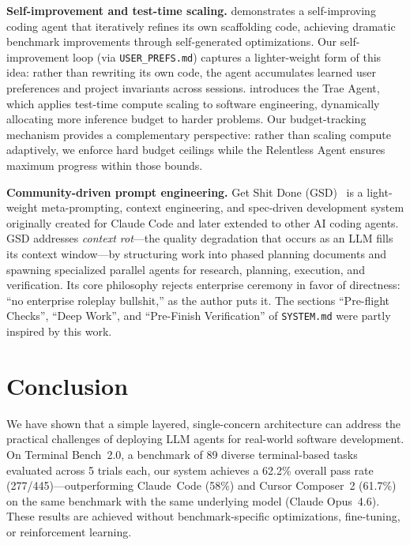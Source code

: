 \documentclass{article}
\begin{document}
\textbf{Self-improvement and test-time scaling.} \citet{robeyns2025selfimproving} demonstrates a self-improving coding agent that iteratively refines its own scaffolding code, achieving dramatic benchmark improvements through self-generated optimizations. Our self-improvement loop (via \texttt{USER\_PREFS.md}) captures a lighter-weight form of this idea: rather than rewriting its own code, the agent accumulates learned user preferences and project invariants across sessions.  \citet{gao2025trae} introduces the Trae Agent, which applies test-time compute scaling to software engineering, dynamically allocating more inference budget to harder problems.  Our budget-tracking mechanism provides a complementary perspective: rather than scaling compute adaptively, we enforce hard budget ceilings while the Relentless Agent ensures maximum progress within those bounds.

\textbf{Community-driven prompt engineering.} Get Shit Done (GSD)~\citep{gsd2025} is a light-weight meta-prompting, context engineering, and spec-driven development system originally created for Claude Code and later extended to other AI coding agents.  GSD addresses \emph{context rot}---the quality degradation that occurs as an LLM fills its context window---by structuring work into phased planning documents and spawning specialized parallel agents for research, planning, execution, and verification.  Its core philosophy rejects enterprise ceremony in favor of directness: ``no enterprise roleplay bullshit,'' as the author puts it.  The sections ``Pre-flight Checks'', ``Deep Work'', and ``Pre-Finish Verification'' of \texttt{SYSTEM.md} were partly inspired by this work.

\section{Conclusion}
\label{sec:conclusion}

We have shown that a simple layered, single-concern architecture can address the practical challenges of deploying LLM agents for real-world software development.  On Terminal Bench~2.0, a benchmark of 89 diverse terminal-based tasks evaluated across 5 trials each, our system achieves a 62.2\% overall pass rate (277/445)---outperforming Claude~Code (58\%) and Cursor Composer~2 (61.7\%) on the same benchmark with the same underlying model (Claude Opus~4.6).  These results are achieved without benchmark-specific optimizations, fine-tuning, or reinforcement learning.
\end{document}
